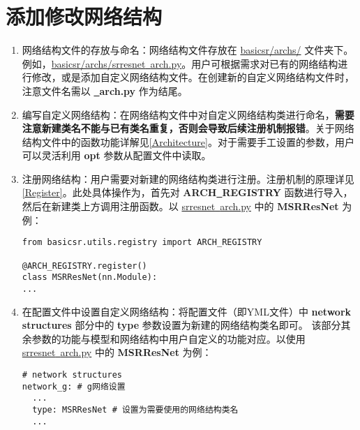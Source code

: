 \documentclass[../main.tex]{subfiles}
\begin{document}
\section{添加修改网络结构}

\begin{enumerate}
    \item 网络结构文件的存放与命名：网络结构文件存放在 \href{https://github.com/XPixelGroup/BasicSR/tree/master/basicsr/archs}{basicsr/archs/} 文件夹下。例如，\href{https://github.com/XPixelGroup/BasicSR/tree/master/basicsr/archs}{basicsr/archs/srresnet\underline{~}arch.py}。用户可根据需求对已有的网络结构进行修改，或是添加自定义网络结构文件。在创建新的自定义网络结构文件时，注意文件名需以  \textbf{\underline{~}arch.py} 作为结尾。

    \item 编写自定义网络结构：在网络结构文件中对自定义网络结构类进行命名，\textbf{需要注意新建类名不能与已有类名重复，否则会导致后续注册机制报错}。关于网络结构文件中的函数功能详解见\ref{Architecture}。对于需要手工设置的参数，用户可以灵活利用 \textbf{opt} 参数从配置文件中读取。

    \item 注册网络结构：用户需要对新建的网络结构类进行注册。注册机制的原理详见\ref{Register}。此处具体操作为，首先对 \textbf{ARCH\underline{~}REGISTRY} 函数进行导入，然后在新建类上方调用注册函数。以 \href{https://github.com/XPixelGroup/BasicSR/tree/master/basicsr/archs/srresnet_arch.py}{srresnet\underline{~}arch.py} 中的 \textbf{MSRResNet} 为例：
          \begin{verbatim}
from basicsr.utils.registry import ARCH_REGISTRY

@ARCH_REGISTRY.register()
class MSRResNet(nn.Module):
...
\end{verbatim}

    \item 在配置文件中设置自定义网络结构：将配置文件（即YML文件）中 \textbf{network structures} 部分中的 \textbf{type} 参数设置为新建的网络结构类名即可。
          该部分其余参数的功能与模型和网络结构中用户自定义的功能对应。以使用 \href{https://github.com/XPixelGroup/BasicSR/tree/master/basicsr/archs/srresnet_arch.py}{srresnet\underline{~}arch.py} 中的 \textbf{MSRResNet} 为例：
          \begin{verbatim}
# network structures
network_g: # g网络设置
  ...
  type: MSRResNet # 设置为需要使用的网络结构类名
  ...
\end{verbatim}
\end{enumerate}
\end{document}
